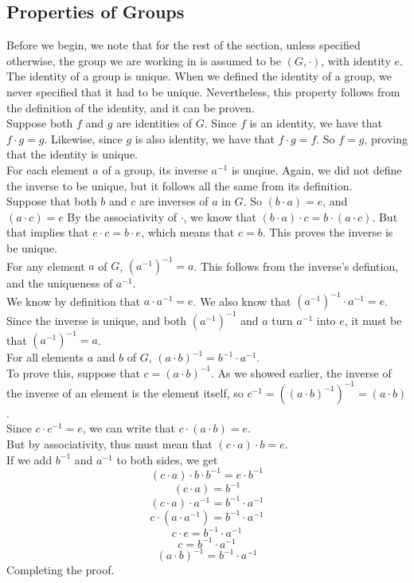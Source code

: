 \documentclass[12pt]{article}
\begin{document}
    \subsection*{Properties of Groups}

    Before we begin,
    we note that for the rest of the section,
    unless specified otherwise,
    the group we are working in is assumed to be $(G, \cdot)$,
    with identity $e$. \\

    The identity of a group is unique.
    When we defined the identity of a group,
    we never specified that it had to be unique.
    Nevertheless,
    this property follows from the definition of the identity,
    and it can be proven. \\
    Suppose both $f$ and $g$ are identities of $G$.
    Since $f$ is an identity, we have that $f \cdot g = g$.
    Likewise, since $g$ is also identity, we have that $f \cdot g = f$.
    So $f = g$, proving that the identity is unique. \\

    For each element $a$ of a group, its inverse $a^{-1}$ is unqiue.
    Again, we did not define the inverse to be unique,
    but it follows all the same from its definition. \\
    Suppose that both $b$ and $c$ are inverses of $a$ in $G$.
    So $(b \cdot a) = e$, and $(a \cdot c) = e$
    By the associativity of $\cdot$, 
    we know that $(b \cdot a) \cdot c = b \cdot (a \cdot c)$.
    But that implies that $e \cdot c = b \cdot e$,
    which means that $c = b$.
    This proves the inverse is be unique. \\

    For any element $a$ of $G$, $(a^{-1})^{-1} = a$.
    This follows from the inverse's defintion,
    and the uniqueness of $a^{-1}$. \\
    We know by definition that $a \cdot a^{-1} = e$.
    We also know that $(a^{-1})^{-1} \cdot a^{-1} = e$.
    Since the inverse is unique,
    and both $(a^{-1})^{-1}$ and $a$ turn $a^{-1}$ into $e$,
    it must be that $(a^{-1})^{-1} = a$. \\

    For all elements $a$ and $b$ of $G$,
    $(a \cdot b)^{-1} = b^{-1} \cdot a^{-1}$. \\ 
    To prove this,
    suppose that $c = (a \cdot b)^{-1}$.
    As we showed earlier, the inverse of the inverse of an element
    is the element itself,
    so $c^{-1} = ((a \cdot b)^{-1})^{-1} = (a \cdot b)$. \\
    Since $c \cdot c^{-1} = e$,
    we can write that $c \cdot (a \cdot b) = e$. \\
    But by associativity,
    thus must mean that $(c \cdot a) \cdot b = e$. \\
    If we add $b^{-1}$ and $a^{-1}$ to both sides, we get
    \[(c \cdot a) \cdot b \cdot b^{-1} = e \cdot b^{-1}\]
    \[(c \cdot a) = b^{-1}\]
    \[(c \cdot a) \cdot a^{-1} = b^{-1} \cdot a^{-1} \]
    \[c \cdot (a \cdot a^{-1}) = b^{-1} \cdot a^{-1} \]
    \[c \cdot e = b^{-1} \cdot a^{-1} \]
    \[c = b^{-1} \cdot a^{-1} \]
    \[(a \cdot b)^{-1} = b^{-1} \cdot a^{-1} \]
    Completing the proof. \\
\end{document}
